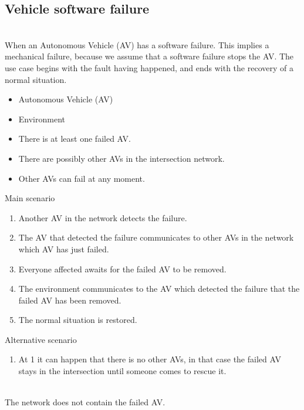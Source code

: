 \documentclass{memoir}
\begin{document}
\subsection{Vehicle software failure}
\begin{description}
	\addtolength{\itemindent}{0.5cm}
	\item[Brief Description] \hfill \\
	When an Autonomous Vehicle (AV) has a software failure. This implies a mechanical failure, because we assume that a software failure stops the AV. The use case begins with the fault having happened, and ends with the recovery of a normal situation.
	
	\item[Actors] \hfill
	\begin{itemize}
		\item Autonomous Vehicle (AV)
		\item Environment
	\end{itemize}
	
	\item[Preconditions] \hfill
	\begin{itemize}
		\item There is at least one failed AV.
		\item There are possibly other AVs in the intersection network.
		\item Other AVs can fail at any moment.
	\end{itemize}
	
	\item[Scenarios] \hfill
	\begin{description}
		\item Main scenario
		\begin{enumerate}
			\item Another AV in the network detects the failure.
			\item The AV that detected the failure communicates to other AVs in the network which AV has just failed.
			\item Everyone affected awaits for the failed AV to be removed.
			\item The environment communicates to the AV which detected the failure that the failed AV has been removed.
			\item The normal situation is restored.
		\end{enumerate}
		\item Alternative scenario
		\begin{enumerate}
			\item At 1 it can happen that there is no other AVs, in that case the failed AV stays in the intersection until someone comes to rescue it.
		\end{enumerate}
	\end{description}
	
	\item[Postconditions] \hfill \\
	The network does not contain the failed AV.
\end{description}
\end{document}

